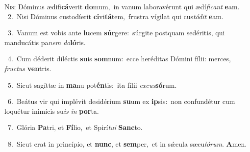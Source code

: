 \lettrine{\initial\textcolor{\initialcolor}{N}}{isi} Dóminus ædifi\-\textbf{cá}\-verit \textbf{do}\-mum,~\star in vanum laboravérunt qui ædí\-\textit{fi}\-\textit{cant} \textbf{e}\-am.\\
{\numbfont\textcolor{\numbcolor}{~2.}}~Nisi Dóminus custodíerit \textbf{ci}\-vi\-\textbf{tá}\-tem,~\star frustra vígilat qui cus\-\textit{tó}\-\textit{dit} \textbf{e}\-am.\par
{\numbfont\textcolor{\numbcolor}{~3.}}~Vanum est vobis ante \textbf{lu}\-cem \textbf{súr}\-gere:~\star súrgite postquam sedéritis, qui manducátis pa\textit{nem} \textit{do}\-\textbf{ló}ris.\par
{\numbfont\textcolor{\numbcolor}{~4.}}~Cum déderit diléctis \textbf{su}\-is \textbf{som}\-num:~\star ecce heréditas Dómini fílii: merces, \textit{fruc}\-\textit{tus} \textbf{ven}\-tris.\par
{\numbfont\textcolor{\numbcolor}{~5.}}~Sicut sagíttæ in \textbf{ma}\-nu pot\-\textbf{én}\-tis:~\star ita fílii \textit{ex}\-\textit{cus}\textbf{só}rum.\par
{\numbfont\textcolor{\numbcolor}{~6.}}~Beátus vir qui implévit desidérium \textbf{su}\-um ex \textbf{ip}\-sis:~\star non confundétur cum loquétur inimícis su\textit{is} \textit{in} \textbf{por}\-ta.\par
{\numbfont\textcolor{\numbcolor}{~7.}}~Glória \textbf{Pa}\-tri, et \textbf{Fí}\-lio,~\star et Spirí\-\textit{tu}\-\textit{i} \textbf{Sanc}\-to.\par
{\numbfont\textcolor{\numbcolor}{~8.}}~Sicut erat in princípio, et \textbf{nunc}\-, et \textbf{sem}\-per,~\star et in sǽcula sæcu\-\textit{ló}\-\textit{rum}. \textbf{A}\-men.\par
